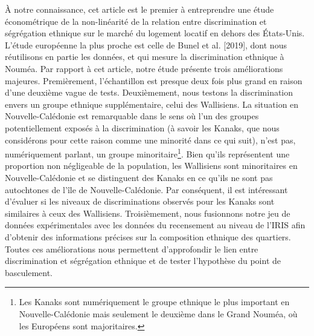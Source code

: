 \documentclass{Revue-economique} %
\begin{document}
\begin{Article}
À notre connaissance, cet article est le premier à entreprendre une étude économétrique de la non-linéarité de la relation entre discrimination et ségrégation ethnique sur le marché du logement locatif en dehors des États-Unis. L’étude européenne la plus proche est celle de Bunel et al. [2019], dont nous réutilisons en partie les données, et qui mesure la discrimination ethnique à Nouméa. Par rapport à cet article, notre étude présente trois améliorations majeures. Premièrement, l’échantillon est presque deux fois plus grand en raison d’une deuxième vague de tests. Deuxièmement, nous testons la discrimination envers un groupe ethnique supplémentaire, celui des Wallisiens. La situation en Nouvelle-Calédonie est remarquable dans le sens où l’un des groupes potentiellement exposés à la discrimination (à savoir les Kanaks, que nous considérons pour cette raison comme une minorité dans ce qui suit), n’est pas, numériquement parlant, un groupe minoritaire\footnote{Les Kanaks sont numériquement le groupe ethnique le plus important en Nouvelle-Calédonie mais seulement le deuxième dans le Grand Nouméa, où les Européens sont majoritaires.}. Bien qu’ils représentent une proportion non négligeable de la population, les Wallisiens sont minoritaires en Nouvelle-Calédonie et se distinguent des Kanaks en ce qu’ils ne sont pas autochtones de l’île de Nouvelle-Calédonie. Par conséquent, il est intéressant d’évaluer si les niveaux de discriminations observés pour les Kanaks sont similaires à ceux des Wallisiens. Troisièmement, nous fusionnons notre jeu de données expérimentales avec les données du recensement au niveau de l’IRIS afin d’obtenir des informations précises sur la composition ethnique des quartiers. Toutes ces améliorations nous permettent d’approfondir le lien entre discrimination et ségrégation ethnique et de tester l’hypothèse du point de basculement.


\end{Article}
\end{document}
